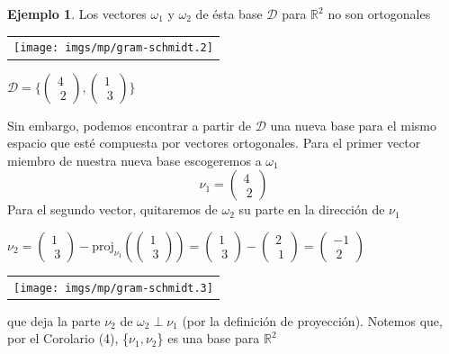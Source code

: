 \documentclass[11pt]{article}
\theoremstyle{definition}
\newtheorem{ejemplo}[ejm]{Ejemplo}
\begin{document}
\begin{ejemplo}
	Los vectores $\omega_1$ y $\omega_2$ de ésta base $\mathcal{D}$ para $\mathbb{R}^2$ no son ortogonales
	
	\begin{center}
	  \qquad	  \begin{tabular}{@{}c@{}}\texttt{[image: imgs/mp/gram-schmidt.2]}\end{tabular}
	$\mathcal{D} = \{\left(\begin{array}{c} 4 \\\ 2\end{array} \right),\left(\begin{array}{c} 1 \\\ 3\end{array} \right)\}$
\end{center}
Sin embargo, podemos encontrar a partir de $\mathcal{D}$ una nueva base para el mismo espacio que esté compuesta por vectores ortogonales. Para el primer vector miembro de nuestra nueva base escogeremos a $\omega_1$
\[\nu_1 = \left(\begin{array}{c} 4 \\\ 2\end{array} \right)\]
Para el segundo vector, quitaremos de $\omega_2$ su parte en la dirección de $\nu_1$
\begin{center}  \small
   $\nu_2 = \left(\begin{array}{c} 1 \\\ 3\end{array} \right) - \textrm{proj}_{\nu_1}(\left(\begin{array}{c} 1 \\\ 3\end{array} \right)) = \left(\begin{array}{c} 1 \\\ 3\end{array} \right) - \left(\begin{array}{c} 2 \\\ 1\end{array} \right) = \left(\begin{array}{c} -1 \\\ 2\end{array} \right)$
   \qquad
 \begin{tabular}{@{}c@{}}\texttt{[image: imgs/mp/gram-schmidt.3]}\end{tabular}
\end{center}
que deja la parte $\nu_2$ de $\omega_2 \perp \nu_1$ (por la definición de proyección). Notemos que, por el Corolario (4), \{$\nu_1,\nu_2$\} es una base para $\mathbb{R}^2$
\end{ejemplo}
\end{document}
